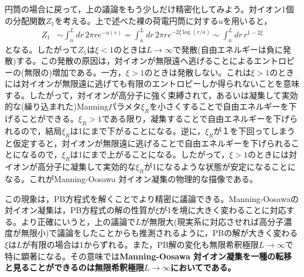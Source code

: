 \documentclass[11pt,a4paper]{ltjsarticle}
\theoremstyle{definition}
\theoremstyle{remark}
\begin{document}
円筒の場合に戻って，上の議論をもう少しだけ精密化してみよう。対イオン1個の分配関数$Z_1$を考える。上で述べた裸の荷電円筒に対する$u$を用いると，
\begin{align}
  Z_1
  &\sim \int_a^L dr\, 2\pi r e^{-u(r)}
  = \int_a^L dr\, 2\pi r e^{-2\xi \log(r/a)}
  \sim \int_a^L dr\, r^{1-2\xi}
\end{align}
となる。したがって$Z_1$は$\xi<1$のときは$L\to\infty$で発散(自由エネルギーは負に発散)する。この発散の原因は，対イオンが無限遠へ逃げることによるエントロピーの(無限の)増加である。一方，$\xi>1$のときは発散しない。これは$\xi>1$のときには対イオンが無限遠に逃げても有限のエントロピーしか得られないことを意味する。したがって，対イオンが高分子に強く束縛されて，あるいは凝集して実効的な(繰り込まれた)Manningパラメタ$\xi_R$を小さくすることで自由エネルギーを下げることができる。$\xi_R>1$である限り，凝集することで自由エネルギーを下げられるので，結局$\xi_R$は1にまで下がることになる。逆に，$\xi_R$が１を下回ってしまうと仮定すると，対イオンが無限遠に逃げることで自由エネルギーを下げられることになるので，$\xi_R$は1にまで上がることになる。したがって，$\xi>1$のときには対イオンが高分子に凝集して実効的な$\xi_R$が1になるような状態が安定になることになる。これがManning-Oosawa 対イオン凝集の物理的な描像である。

この現象は，PB方程式を解くことでより精密に議論できる。Manning-Oosawaの対イオン凝集は，PB方程式の解の性質が$\xi$が1を境に大きく変わることに対応する。より正確にいうと，上の議論で$L$が無限大(現実系に対応させれば高分子濃度が無限小)で議論をしたことからも推測されるように，PBの解が大きく変わる$\xi$は$L$が有限の場合は1からずれる。また，PB解の変化も無限希釈極限$L\to\infty$で特に顕著になる。その意味では\textbf{Manning-Oosawa 対イオン凝集を一種の転移と見ることができるのは無限希釈極限$L\to\infty$においてである。}
\end{document}
